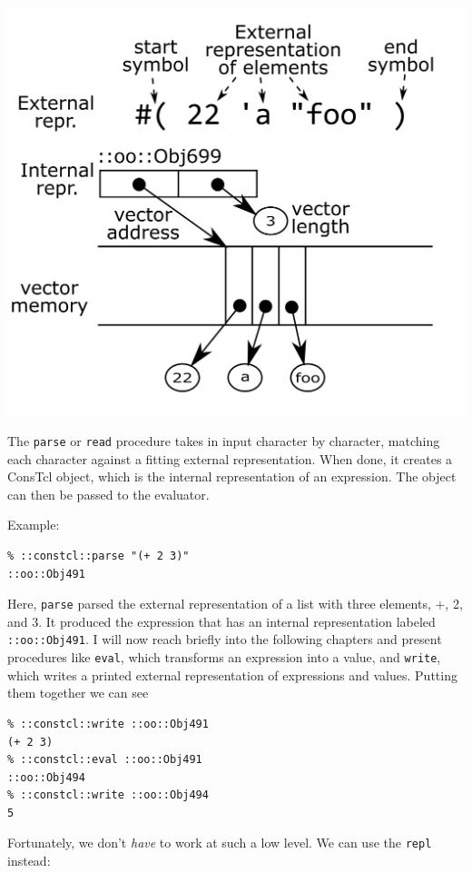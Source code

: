 \documentclass[twoside]{report}
\begin{document}
\includegraphics{images/vector-representation.png}

The \texttt{parse} or \texttt{read} procedure takes in input character by character, matching each character against a fitting external representation. When done, it creates a ConsTcl object, which is the internal representation of an expression. The object can then be passed to the evaluator.

Example:

\begin{verbatim}
% ::constcl::parse "(+ 2 3)"
::oo::Obj491
\end{verbatim}

Here, \texttt{parse} parsed the external representation of a list with three elements, +, 2, and 3. It produced the expression that has an internal representation labeled \texttt{::oo::Obj491}. I will now reach briefly into the following chapters and present procedures like \texttt{eval}, which transforms an expression into a value, and \texttt{write}, which writes a printed external representation of expressions and values. Putting them together we can see

\begin{verbatim}
% ::constcl::write ::oo::Obj491
(+ 2 3)
% ::constcl::eval ::oo::Obj491
::oo::Obj494
% ::constcl::write ::oo::Obj494
5
\end{verbatim}

Fortunately, we don't \emph{have} to work at such a low level. We can use the \texttt{repl} instead:
\end{document}
